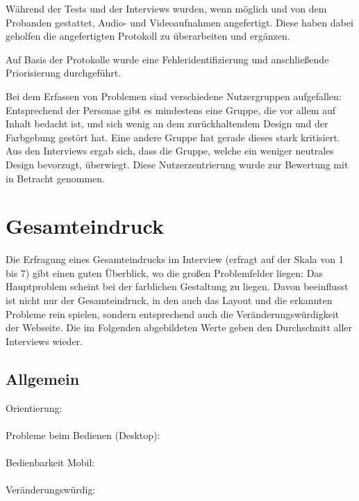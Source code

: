 \newcommand{\id}[1]{\refstepcounter{id}\label{#1}\theid}
\renewcommand{\arraystretch}{1.5}

Während der Tests und der Interviews wurden, wenn möglich und von dem Probanden gestattet, Audio- und Videoaufnahmen angefertigt. Diese haben dabei geholfen die angefertigten Protokoll zu überarbeiten und ergänzen.

Auf Basis der Protokolle wurde eine Fehleridentifizierung und anschließende Priorisierung durchgeführt.

Bei dem Erfassen von Problemen sind verschiedene Nutzergruppen aufgefallen: Entsprechend der Personae gibt es mindestens eine Gruppe, die vor allem auf Inhalt bedacht ist, und sich wenig an dem zurückhaltendem Design und der Farbgebung gestört hat. Eine andere Gruppe hat gerade dieses stark kritisiert. Aus den Interviews ergab sich, dass die Gruppe, welche ein weniger neutrales Design bevorzugt, überwiegt. Diese Nutzerzentrierung wurde zur Bewertung mit in Betracht genommen.

\section{Gesamteindruck}
Die Erfragung eines Gesamteindrucks im Interview (erfragt auf der Skala von 1 bis 7) gibt einen guten Überblick, wo die großen Problemfelder liegen: Das Hauptproblem scheint bei der farblichen Gestaltung zu liegen. Davon beeinflusst ist nicht nur der Gesamteindruck, in den auch das Layout und die erkannten Probleme rein spielen, sondern entsprechend auch die Veränderungswürdigkeit der Webseite. Die im Folgenden abgebildeten Werte geben den Durchschnitt aller Interviews wieder.

\subsection{Allgemein}
\begin{center}
Orientierung:\\
\\\bigskip
Probleme beim Bedienen (Desktop):\\
\\\bigskip
Bedienbarkeit Mobil:\\
\\\bigskip
\clearpage
Veränderungswürdig:\\
\end{center}
